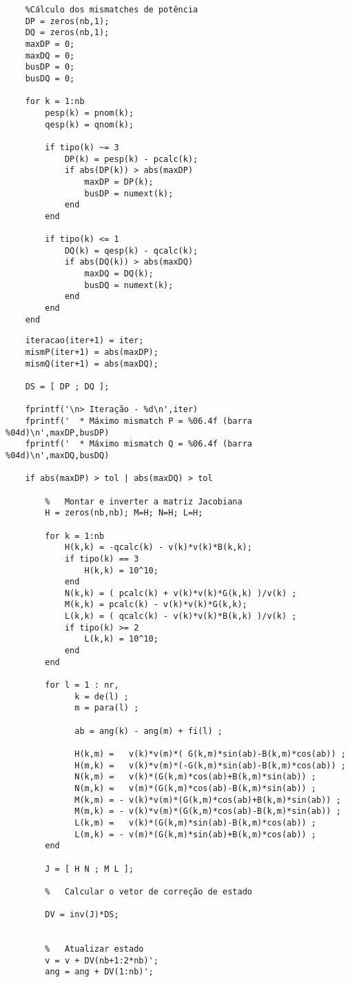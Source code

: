 \begin{verbatim}
    %Cálculo dos mismatches de potência
    DP = zeros(nb,1);
    DQ = zeros(nb,1);
    maxDP = 0;
    maxDQ = 0;
    busDP = 0;
    busDQ = 0;

    for k = 1:nb
        pesp(k) = pnom(k);
        qesp(k) = qnom(k);

        if tipo(k) ~= 3
            DP(k) = pesp(k) - pcalc(k);
            if abs(DP(k)) > abs(maxDP)
                maxDP = DP(k);
                busDP = numext(k);
            end
        end
        
        if tipo(k) <= 1
            DQ(k) = qesp(k) - qcalc(k);
            if abs(DQ(k)) > abs(maxDQ)
                maxDQ = DQ(k);
                busDQ = numext(k);
            end
        end
    end
\end{verbatim}
\begin{verbatim}
    iteracao(iter+1) = iter;
    mismP(iter+1) = abs(maxDP);
    mismQ(iter+1) = abs(maxDQ);

    DS = [ DP ; DQ ];

    fprintf('\n> Iteração - %d\n',iter)
    fprintf('  * Máximo mismatch P = %06.4f (barra %04d)\n',maxDP,busDP)
    fprintf('  * Máximo mismatch Q = %06.4f (barra %04d)\n',maxDQ,busDQ)

    if abs(maxDP) > tol | abs(maxDQ) > tol

        %	Montar e inverter a matriz Jacobiana
        H = zeros(nb,nb); M=H; N=H; L=H;

        for k = 1:nb
            H(k,k) = -qcalc(k) - v(k)*v(k)*B(k,k);
            if tipo(k) == 3
                H(k,k) = 10^10;
            end
            N(k,k) = ( pcalc(k) + v(k)*v(k)*G(k,k) )/v(k) ;
            M(k,k) = pcalc(k) - v(k)*v(k)*G(k,k);
            L(k,k) = ( qcalc(k) - v(k)*v(k)*B(k,k) )/v(k) ;
            if tipo(k) >= 2
                L(k,k) = 10^10;
            end
        end

        for l = 1 : nr,
              k = de(l) ;
              m = para(l) ;

              ab = ang(k) - ang(m) + fi(l) ;

              H(k,m) =   v(k)*v(m)*( G(k,m)*sin(ab)-B(k,m)*cos(ab)) ;
              H(m,k) =   v(k)*v(m)*(-G(k,m)*sin(ab)-B(k,m)*cos(ab)) ;
              N(k,m) =   v(k)*(G(k,m)*cos(ab)+B(k,m)*sin(ab)) ;
              N(m,k) =   v(m)*(G(k,m)*cos(ab)-B(k,m)*sin(ab)) ;
              M(k,m) = - v(k)*v(m)*(G(k,m)*cos(ab)+B(k,m)*sin(ab)) ;
              M(m,k) = - v(k)*v(m)*(G(k,m)*cos(ab)-B(k,m)*sin(ab)) ;
              L(k,m) =   v(k)*(G(k,m)*sin(ab)-B(k,m)*cos(ab)) ;
              L(m,k) = - v(m)*(G(k,m)*sin(ab)+B(k,m)*cos(ab)) ;
        end

        J = [ H N ; M L ];

        %	Calcular o vetor de correção de estado

        DV = inv(J)*DS;
        

        %	Atualizar estado
        v = v + DV(nb+1:2*nb)';
        ang = ang + DV(1:nb)';
        
\end{verbatim}
